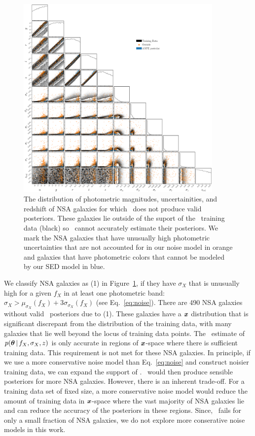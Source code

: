 \begin{figure}
\begin{center}
    \includegraphics[width=0.9\textwidth]{figs/fails.pdf}
    \caption{\label{fig:fail}
    The distribution of photometric magnitudes, uncertainities, and redshift of
    NSA galaxies for which \sedflow~does not produce valid posteriors. 
    These galaxies lie outside of the suport of the \sedflow~training data
    (black) so \sedflow~cannot accurately estimate their posteriors. 
    We mark the NSA galaxies that have unusually high photometric uncertainties
    that are not accounted for in our noise model in orange and galaxies that
    have photometric colors that cannot be modeled by our SED model in blue. 
    }
\end{center}
\end{figure}
We classify NSA galaxies as (1) in Figure~\ref{fig:fail}, if they have
$\sigma_X$ that is unusually high for a given $f_X$ in at least one photometric
band: $\sigma_X > \mu_{\sigma_X}(f_X) + 3 \sigma_{\sigma_X}(f_X)$
(see Eq.~\ref{eq:noise}). 
There are 490 NSA galaxies without valid \sedflow~posteriors due to (1).
These galaxies have a $\textbf{\textit{x}}$ distribution that is significant discrepant
from the distribution of the training data, with many galaxies that lie well
beyond the locus of training data points. 
The \sedflow~estimate of $p(\boldsymbol{\theta} \,|\, f_X, \sigma_X, z)$ is only accurate in
regions of $\textbf{\textit{x}}$-space where there is sufficient training data. 
This requirement is not met for these NSA galaxies.  
In principle, if we use a more conservative noise model than Eq.~\ref{eq:noise}
and construct noisier training data, we can expand the support of \sedflow. 
\sedflow~would then produce sensible posteriors for more NSA galaxies. 
However, there is an inherent trade-off. 
For a training data set of fixed size, a more conservative noise model would
reduce the amount of training data in $\textbf{\textit{x}}$-space where the vast majority
of NSA galaxies lie and can reduce the accuracy of the posteriors in these
regions. 
Since, \sedflow~fails for only a small fraction of NSA galaxies, we do not
explore more conserative noise models in this work.

